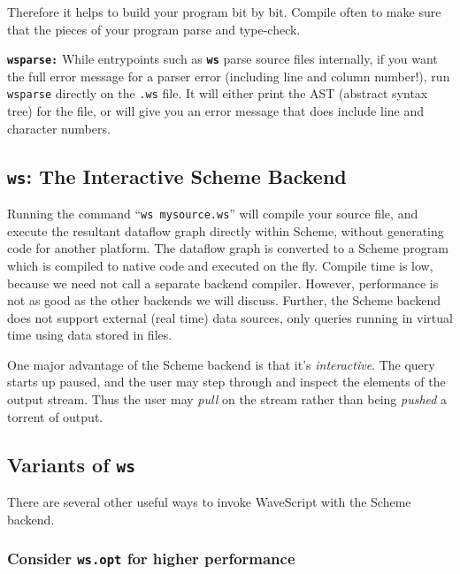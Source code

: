 \documentclass[twocolumn]{report}
\begin{document}
Therefore it helps to build your program bit by bit.  Compile often to make
sure that the pieces of your program parse and type-check.

{\tt \bf wsparse:} While entrypoints such as {\tt \bf ws} parse source files
internally, if you want the full error message for a parser error
(including line and column number!), run {\tt wsparse} directly on the
{\tt .ws} file.  It will either print the AST (abstract syntax tree) for the
file, or will give you an error message that does include line and
character numbers.

\subsection{{\tt \bf ws}: The Interactive Scheme Backend}

Running the command ``{\tt ws mysource.ws}'' will compile your source
file, and execute the resultant dataflow graph directly within Scheme,
without generating code for another platform.
%
The dataflow graph is converted to a Scheme program which is compiled
to native code and executed on the fly.  Compile time is low, because
we need not call a separate backend compiler.  However, performance is
not as good as the other backends we will discuss.  Further, the
Scheme backend does not support external (real time) data sources,
only queries running in virtual time using data stored in files.

One major advantage of the Scheme backend is that it's {\em
  interactive}.  The query starts up paused, and the user may step
through and inspect the elements of the output stream.  Thus the user
may {\em pull} on the stream rather than being {\em pushed} a torrent
of output.


\subsection*{Variants of {\tt \bf ws}}

There are several other useful ways to invoke WaveScript with the
Scheme backend.

\subsubsection*{Consider {\tt \bf ws.opt} for higher performance}
\end{document}
